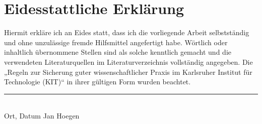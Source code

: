 \documentclass[
	journal,
	a4paper,
]{IEEEtran}
\begin{document}


\appendices



\section{Eidesstattliche Erklärung}
\label{app:eidesstattliche}
Hiermit erkläre ich an Eides statt, dass ich die vorliegende Arbeit selbstständig und
ohne unzulässige fremde Hilfsmittel angefertigt habe. Wörtlich oder inhaltlich übernommene Stellen sind als solche kenntlich gemacht und die verwendeten Literaturquellen im Literaturverzeichnis vollständig angegeben. Die „Regeln zur Sicherung guter wissenschaftlicher Praxis im Karlsruher Institut für Technologie (KIT)“ in ihrer gültigen Form wurden beachtet.

\vspace{3em}
\noindent
\rule{0.9\linewidth}{0.5pt}\\
Ort, Datum \qquad\qquad Jan Hoegen



\end{document}
